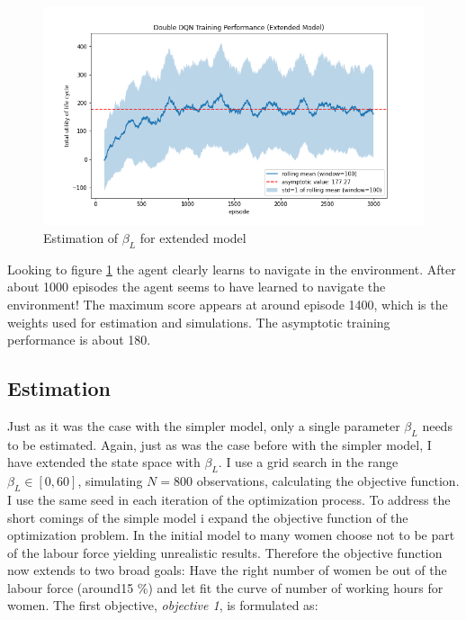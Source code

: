 \begin{figure}[ht]
    \centering
    \includegraphics[scale=0.4]{figures/ddqn_extended_model_training_performance.png}
    \caption{Estimation of $\beta_L$ for extended model}
    \label{fig:training_extended}
\end{figure}

Looking to figure \ref{fig:training_extended} the agent clearly learns to navigate in the environment. After about 1000 episodes the agent seems to have learned to navigate the environment! The maximum score appears at around episode 1400, which is the weights used for estimation and simulations. The asymptotic training performance is about 180.


\subsection{Estimation}

Just as it was the case with the simpler model, only a single parameter $\beta_L$ needs to be estimated. Again, just as was the case before with the simpler model, I have extended the state space with $\beta_L$. I use a grid search in the range $\beta_L \in [0, 60]$, simulating $N=800$ observations, calculating the objective function. I use the same seed in each iteration of the optimization process. To address the short comings of the simple model i expand the objective function of the optimization problem. In the initial model to many women choose not to be part of the labour force yielding unrealistic results. Therefore the objective function now extends to two broad goals: Have the right number of women be out of the labour force (around15 \%) and let fit the curve of number of working hours for women. The first objective, \textit{objective 1}, is formulated as: 

